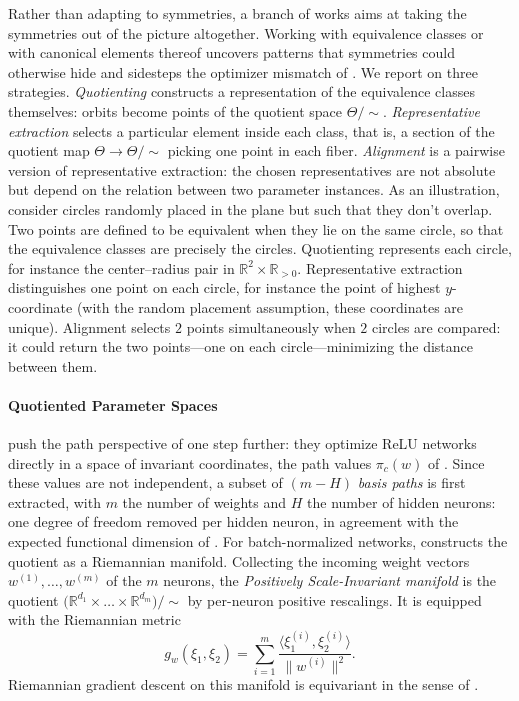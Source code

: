 \documentclass[mathematics,review,submit,moreauthors]{Definitions/mdpi}
\begin{document}
Rather than adapting to symmetries, a branch of works aims at taking the symmetries out of the picture altogether.
Working with equivalence classes or with canonical elements thereof uncovers patterns that symmetries could otherwise hide and sidesteps the optimizer mismatch of .
We report on three strategies.
\emph{Quotienting} constructs a representation of the equivalence classes themselves: orbits become points of the quotient space $\Theta/\!\sim$.
\emph{Representative extraction} selects a particular element inside each class, that is, a section of the quotient map $\Theta\to\Theta/\!\sim$ picking one point in each fiber.
\emph{Alignment} is a pairwise version of representative extraction: the chosen representatives are not absolute but depend on the relation between two parameter instances.
As an illustration, consider circles randomly placed in the plane but such that they don't overlap.
Two points are defined to be equivalent when they lie on the same circle, so that the equivalence classes are precisely the circles.
Quotienting represents each circle, for instance the center--radius pair in $\mathbb{R}^2\times\mathbb{R}_{>0}$.
Representative extraction distinguishes one point on each circle, for instance the point of highest $y$-coordinate (with the random placement assumption, these coordinates are unique).
Alignment selects $2$ points simultaneously when $2$ circles are compared: it could return the two points---one on each circle---minimizing the distance between them.

\paragraph{Quotiented Parameter Spaces}
\citet{meng2019} push the path perspective of \citet{neyshabur2015anips} one step further: they optimize ReLU networks directly in a space of invariant coordinates, the path values $\pi_c(w)$ of .
Since these values are not independent, a subset of $(m-H)$ \emph{basis paths} is first extracted, with $m$ the number of weights and $H$ the number of hidden neurons: one degree of freedom removed per hidden neuron, in agreement with the expected functional dimension of .
For batch-normalized networks, \citet{yi2022ptcuai} constructs the quotient as a Riemannian manifold.
Collecting the incoming weight vectors $w^{(1)},\dots,w^{(m)}$ of the $m$ neurons, the \emph{Positively Scale-Invariant manifold} is the quotient $\big(\mathbb{R}^{d_1}\times\dots\times\mathbb{R}^{d_m}\big)/\!\sim$ by per-neuron positive rescalings.
It is equipped with the Riemannian metric
\begin{equation*}
    g_{w}(\xi_1,\xi_2)=\sum_{i=1}^{m}\frac{\langle\xi_1^{(i)},\xi_2^{(i)}\rangle}{\lVert w^{(i)}\rVert^2}.
\end{equation*}
Riemannian gradient descent on this manifold is equivariant in the sense of .
\end{document}
